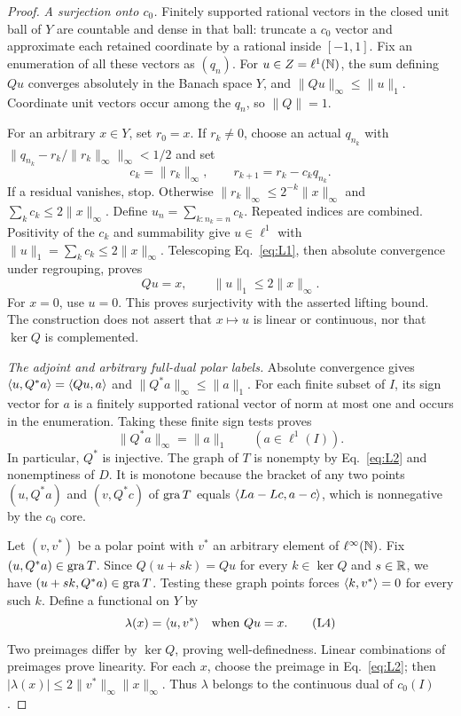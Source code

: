 \begin{proof}
\noindent\textit{A surjection onto $c_0$.}
\label{sec:L1}
Finitely supported rational vectors in the closed unit ball of $Y$ are
countable and dense in that ball: truncate a $c_0$ vector and approximate
each retained coordinate by a rational inside $[-1,1]$. Fix an enumeration
of all these vectors as $(q_n)$. For $u\in Z=\ell^1(\mathbb N)$, the sum defining
$Qu$ converges absolutely in the Banach space $Y$, and
$\|Qu\|_\infty\le\|u\|_1$. Coordinate unit vectors occur among the $q_n$,
so $\|Q\|=1$.

For an arbitrary $x\in Y$, set $r_0=x$. If $r_k\ne0$, choose an actual
$q_{n_k}$ with $\|q_{n_k}-r_k/\|r_k\|_\infty\|_\infty<1/2$ and set
\begin{equation}
c_k=\|r_k\|_\infty,\qquad r_{k+1}=r_k-c_kq_{n_k}.
\tag{L1}\label{eq:L1}
\end{equation}
If a residual vanishes, stop. Otherwise
$\|r_k\|_\infty\le2^{-k}\|x\|_\infty$ and $\sum_k c_k\le2\|x\|_\infty$.
Define $u_n=\sum_{k:n_k=n}c_k$. Repeated indices are combined.
Positivity of the $c_k$ and summability give $u\in\ell^1$ with
$\|u\|_1=\sum_k c_k\le2\|x\|_\infty$.
Telescoping Eq.~\eqref{eq:L1}, then absolute convergence under regrouping,
proves
\begin{equation}
Qu=x,\qquad \|u\|_1\le2\|x\|_\infty.
\tag{L2}\label{eq:L2}
\end{equation}
For $x=0$, use $u=0$. This proves surjectivity with the asserted lifting
bound. The construction does not assert that $x\mapsto u$ is linear or
continuous, nor that $\ker Q$ is complemented.

\noindent\textit{The adjoint and arbitrary full-dual polar labels.}
\label{sec:L2}
Absolute convergence gives $\langle u,Q^*a\rangle=\langle Qu,a\rangle$ and
$\|Q^*a\|_\infty\le\|a\|_1$. For each finite subset of $I$, its sign
vector for $a$ is a finitely supported rational vector of norm at most
one and occurs in the enumeration. Taking these finite sign tests proves
\begin{equation}
\|Q^*a\|_\infty=\|a\|_1\qquad(a\in\ell^1(I)).
\tag{L3}\label{eq:L3}
\end{equation}
In particular, $Q^*$ is injective. The graph of $T$ is nonempty by
Eq.~\eqref{eq:L2} and nonemptiness of $D$. It is monotone because the
bracket of any two points $(u,Q^*a)$ and $(v,Q^*c)$ of $\operatorname{gra} T$ equals
$\langle La-Lc,a-c\rangle$, which is nonnegative by the $c_0$ core.

Let $(v,v^*)$ be a polar point with $v^*$ an arbitrary element of
$\ell^\infty(\mathbb N)$. Fix $(u,Q^*a)\in\operatorname{gra} T$. Since $Q(u+sk)=Qu$ for
every $k\in\ker Q$ and $s\in\mathbb R$, we have $(u+sk,Q^*a)\in\operatorname{gra} T$.
Testing these graph points forces
$\langle k,v^*\rangle=0$ for every such $k$. Define a functional on $Y$ by
\begin{equation}
\lambda(x)=\langle u,v^*\rangle\quad\text{when }Qu=x.
\tag{L4}\label{eq:L4}
\end{equation}
Two preimages differ by $\ker Q$, proving well-definedness. Linear
combinations of preimages prove linearity. For each $x$, choose the
preimage in Eq.~\eqref{eq:L2}; then
$|\lambda(x)|\le2\|v^*\|_\infty\|x\|_\infty$. Thus $\lambda$ belongs to
the continuous dual of $c_0(I)$.


\end{proof}
